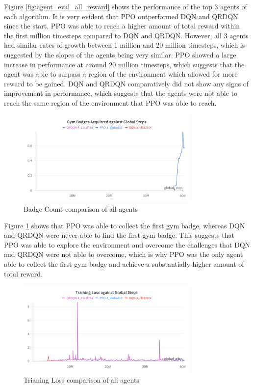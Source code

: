 Figure \ref{fig:agent_eval_all_reward} shows the performance of the top 3 agents of each algorithm. It is very evident that PPO outperformed DQN and QRDQN since the start. PPO was able to reach a higher amount of total reward within the first million timesteps compared to DQN and QRDQN. However, all 3 agents had similar rates of growth between 1 million and 20 million timesteps, which is suggested by the slopes of the agents being very similar. PPO showed a large increase in performance at around 20 million timesteps, which suggests that the agent was able to surpass a region of the environment which allowed for more reward to be gained. DQN and QRDQN comparatively did not show any signs of improvement in performance, which suggests that the agents were not able to reach the same region of the environment that PPO was able to reach.

\begin{figure}[H]
    \centering
    \includegraphics[width=0.8\textwidth]{figures/3_Badge_Count.png}
    \caption{Badge Count comparison of all agents}
    \label{fig:agent_eval_all_badge}
\end{figure}

Figure \ref{fig:agent_eval_all_badge} shows that PPO was able to collect the first gym badge, whereas DQN and QRDQN were never able to find the first gym badge. This suggests that PPO was able to explore the environment and overcome the challenges that DQN and QRDQN were not able to overcome, which is why PPO was the only agent able to collect the first gym badge and achieve a substantially higher amount of total reward. 

\begin{figure}[H]
    \centering
    \includegraphics[width=0.8\textwidth]{figures/3_Training_Loss.png}
    \caption{Trianing Loss comparison of all agents}
    \label{fig:agent_eval_all_loss}
\end{figure}

